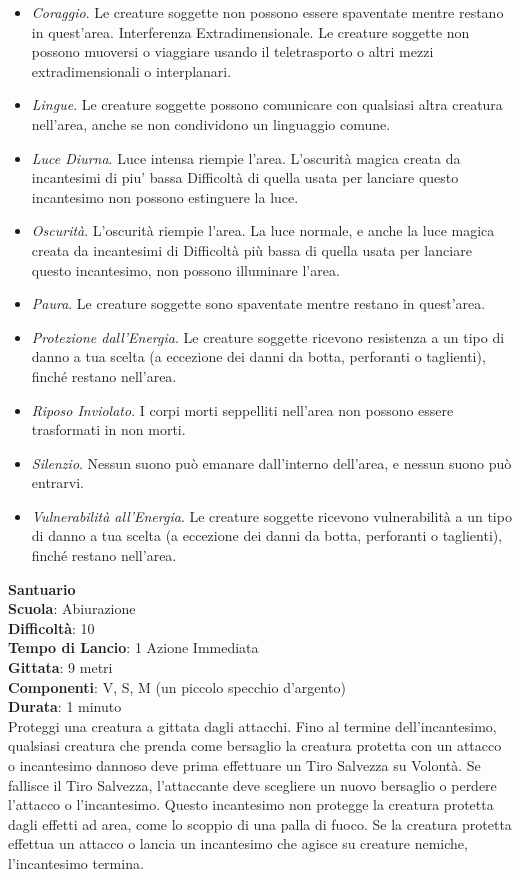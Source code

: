 \begin{multicols}{2}
\medskip
\begin{itemize}
\item
\textit{Coraggio}. Le creature soggette non possono essere spaventate mentre restano in quest'area. Interferenza Extradimensionale. Le creature soggette non possono muoversi o viaggiare usando il teletrasporto o altri mezzi extradimensionali o interplanari.
\item
\textit{Lingue}. Le creature soggette possono comunicare con qualsiasi altra creatura nell'area, anche se non condividono un linguaggio comune. 
\item
\textit{Luce Diurna}. Luce intensa riempie l'area. L'oscurità magica creata da incantesimi di piu' bassa Difficoltà di quella usata per lanciare questo incantesimo non possono estinguere la luce.
\item
\textit{Oscurità}. L'oscurità riempie l'area. La luce normale, e anche la luce magica creata da incantesimi di Difficoltà più bassa di quella usata per lanciare questo incantesimo, non possono illuminare l'area. 
\item
\textit{Paura}. Le creature soggette sono spaventate mentre restano in quest'area.
\item
\textit{Protezione dall'Energia}. Le creature soggette ricevono resistenza a un tipo di danno a tua scelta (a eccezione dei danni da botta, perforanti o taglienti), finché restano nell'area.
\item
\textit{Riposo Inviolato}. I corpi morti seppelliti nell'area non possono essere trasformati in non morti. 
\item
\textit{Silenzio}. Nessun suono può emanare dall'interno dell'area, e nessun suono può entrarvi.
\item
\textit{Vulnerabilità all'Energia}. Le creature soggette ricevono vulnerabilità a un tipo di danno a tua scelta (a eccezione dei danni da botta, perforanti o taglienti), finché restano nell'area.
\end{itemize}

\medskip\textbf{Santuario}\\
\textbf{Scuola}: Abiurazione\\
\textbf{Difficoltà}: 10\\
\textbf{Tempo di Lancio}: 1 Azione Immediata\\
\textbf{Gittata}: 9 metri\\
\textbf{Componenti}: V, S, M (un piccolo specchio d'argento)\\
\textbf{Durata}: 1 minuto\\
Proteggi una creatura a gittata dagli attacchi. Fino al termine dell'incantesimo, qualsiasi creatura che prenda come bersaglio la creatura protetta con un attacco o incantesimo dannoso deve prima effettuare un Tiro Salvezza su Volontà. Se fallisce il Tiro Salvezza, l'attaccante deve scegliere un nuovo bersaglio o perdere l'attacco o l'incantesimo. Questo incantesimo non protegge la creatura protetta dagli effetti ad area, come lo scoppio di una palla di fuoco. Se la creatura protetta effettua un attacco o lancia un incantesimo che agisce su creature nemiche, l'incantesimo termina.


\end{multicols}

